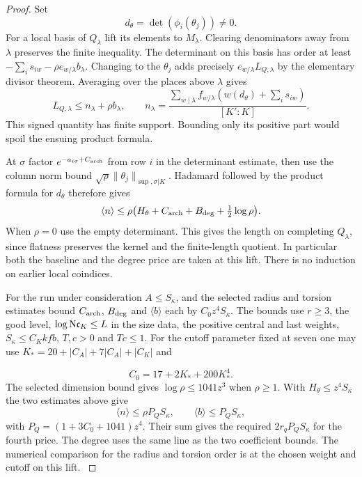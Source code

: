 \begin{proof}
Set 
\[
  d_\theta=\det(\phi_i(\theta_j))\ne0.
\]
For a local basis of \(Q_\lambda\) lift its elements to
\(M_\lambda\). Clearing denominators away from \(\lambda\)
preserves the finite inequality. The determinant on this
basis has order at least \(-\sum_i s_{iw}-\rho e_{w/\lambda}
b_\lambda\). Changing to the \(\theta_j\) adds precisely
\(e_{w/\lambda} L_{Q,\lambda}\) by the elementary divisor
theorem. Averaging over the places above \(\lambda\) gives
\[
 L_{Q,\lambda}\le n_\lambda+\rho b_\lambda,\qquad
 n_\lambda=
 \frac{\sum_{w\mid\lambda} f_{w/\lambda}
                    (w(d_\theta)+\sum_i s_{iw})}{[K':K]} .
\]
This signed quantity has finite support. Bounding only its
positive part would spoil the ensuing product formula.

At \(\sigma\) factor \(e^{-a_{i\sigma}+C_{\rm arch}}\) from
row \(i\) in the determinant estimate, then use the column
norm bound \(\sqrt\rho\|\theta_j\|_{\sup,\sigma|K}\).
Hadamard followed by the product formula for \(d_\theta\)
therefore gives
\[
 \langle n\rangle\le
 \rho\big(H_\theta+C_{\rm arch}+B_{\rm deg}
                              +\tfrac12\log\rho\big).
\]
When \(\rho=0\) use the empty determinant. This gives the
length on completing \(Q_\lambda\), since flatness preserves
the kernel and the finite-length quotient. In particular
both the baseline and the degree price are taken at this
lift. There is no induction on earlier local coindices.

For the run under consideration \(A\le S_\kappa\), and
the selected radius and torsion estimates bound
\(C_{\rm arch}\), \(B_{\rm deg}\) and \(\langle b\rangle\)
each by \(C_0 z^4 S_\kappa\). The bounds use \(r\ge3\),
the good level, \(\log {\rm N}\mathfrak c_K\le L\) in
the size data, the positive central and last weights,
\(S_\kappa\le C_K kfb\), \(T,c>0\) and \(Tc\le1\).
For the cutoff parameter fixed at seven one may use
\(K_*=20+|C_A|+7|C_A|+|C_K|\) and

\[
  C_0=17+2K_*+200K_*^4.
\]
 The selected dimension bound
gives \(\log\rho\le1041z^3\) when \(\rho\ge1\).
With \(H_\theta\le z^4 S_\kappa\) the two estimates above
give \[
 \langle n\rangle\le\rho P_Q S_\kappa,\qquad \langle b\rangle\le P_Q S_\kappa,
\] with
\(P_Q=(1+3C_0+1041)z^4\). Their sum gives the required
\(2r_q P_Q S_\kappa\) for the fourth price. The degree uses the same line as the two coefficient bounds.
The numerical comparison for the radius and torsion order
is at the chosen weight and cutoff on this lift. \label{cor:slice-budget-2}

\end{proof}

